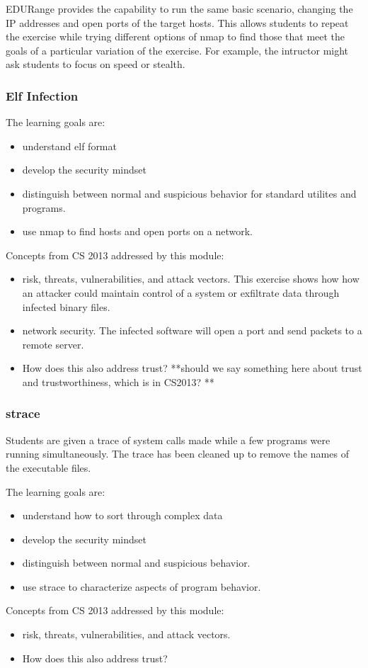 EDURange provides the capability to run the same basic scenario, changing the IP addresses and open ports
of the target hosts.  This allows students to repeat the exercise while trying different options of nmap to
find those that meet the goals of a particular variation of the exercise.  For example, the intructor
might ask students to focus on speed or stealth.

\subsubsection{Elf Infection}
The learning goals are:
\begin{itemize}
\item understand elf format
\item develop the security mindset
\item distinguish between normal and suspicious behavior for standard utilites and programs.
\item use nmap to find hosts and open ports on a network.
\end{itemize}
Concepts from CS 2013 addressed by this module:
\begin{itemize}
\item  risk, threats, vulnerabilities, and attack vectors.  This exercise shows how how an attacker
  could maintain control of a system or exfiltrate data through infected binary files.
\item network security.  The infected software will open a port and send packets to a remote server.
\item How does this also address trust? **should we say something
here about trust and trustworthiness, which is in CS2013? **
\end{itemize}

\subsubsection{strace}
Students are given a trace of system calls made while a few programs were running simultaneously.
The trace has been cleaned up to remove the names of the executable files.

The learning goals are:
\begin{itemize}
\item understand how to sort through complex data
\item develop the security mindset
\item distinguish between normal and suspicious behavior.
\item use strace to characterize aspects of program behavior.
\end{itemize}
Concepts from CS 2013 addressed by this module:
\begin{itemize}
\item  risk, threats, vulnerabilities, and attack vectors.  

\item How does this also address trust?
\end{itemize}


